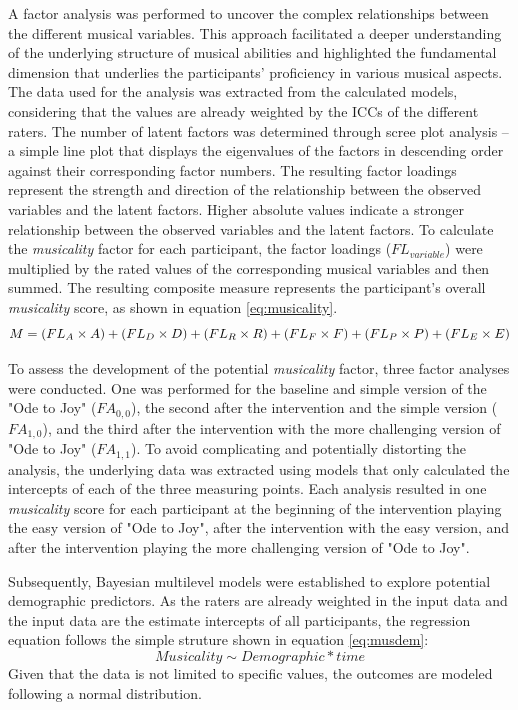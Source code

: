 A factor analysis was performed to uncover the complex relationships between the different musical variables.
This approach facilitated a deeper understanding of the underlying structure of musical abilities and highlighted the fundamental dimension that underlies the participants' proficiency in various musical aspects. The data used for the analysis was extracted from the calculated models, considering that the values are already weighted by the ICCs of the different raters. 
The number of latent factors was determined through scree plot analysis -- a simple line plot that displays the eigenvalues of the factors in descending order against their corresponding factor numbers. The resulting factor loadings represent the strength and direction of the relationship between the observed variables and the latent factors. Higher absolute values indicate a stronger relationship between the observed variables and the latent factors. To calculate the \textit{musicality} factor for each participant, the factor loadings ($FL_{variable}$) were multiplied by the rated values of the corresponding musical variables and then summed. The resulting composite measure represents the participant's overall \textit{musicality} score, as shown in equation \ref{eq:musicality}.
\begin{equation}
	\label{eq:musicality}
	M = (FL_A \times A) + (FL_D \times D) +\\ (FL_R\times R) + (FL_F\times F) + (FL_P \times P) + (FL_E \times E)
\end{equation}

To assess the development of the potential \textit{musicality} factor, three factor analyses were conducted. One was performed for the baseline and simple version of the "Ode to Joy" ($FA_{0,0}$),  the second after the intervention and the simple version ($FA_{1,0}$), and the third after the intervention with the more challenging version of "Ode to Joy" ($FA_{1,1}$). To avoid complicating and potentially distorting the analysis, the underlying data was extracted using models that only calculated the intercepts of each of the three measuring points. Each analysis resulted in one \textit{musicality} score for each participant at the beginning of the intervention playing the easy version of "Ode to Joy", after the intervention with the easy version, and after the intervention playing the more challenging version of "Ode to Joy". 

Subsequently, Bayesian multilevel models were established to explore potential demographic predictors. As the raters are already weighted in the input data and the input data are the estimate intercepts of all participants, the regression equation follows the simple struture shown in equation \ref{eq:musdem}:
\begin{equation}
	\label{eq:musdem}
	Musicality \sim Demographic * time
\end{equation}
Given that the data is not limited to specific values, the outcomes are modeled following a normal distribution.